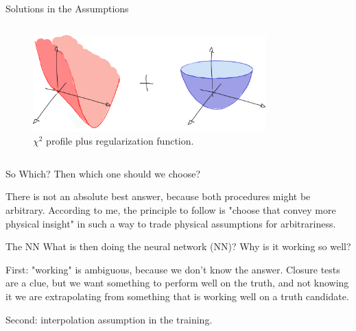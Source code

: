 \documentclass[9pt]{beamer}
\begin{document}
\begin{frame}{Solutions in the Assumptions}
\begin{columns}
\begin{column}{0.5\textwidth}
            \begin{figure}
                \centering
                \includegraphics[width=0.8\textwidth]{regularized}
                \caption{$\chi^2$ profile plus regularization function.}
            \end{figure}
        \end{column}
    \end{columns}
\end{frame}

\begin{frame}{So Which?}
    Then which one should we choose?

    There is not an absolute best answer, because both procedures might be arbitrary.
    According to me, the principle to follow is "choose that convey more
    physical insight" in such a way to trade physical assumptions for arbitrariness.
\end{frame}

\begin{frame}{The NN}
    What is then doing the neural network (NN)? Why is it working so well?

    First: "working" is ambiguous, because we don't know the answer. Closure
    tests are a clue, but we want something to perform well on the truth, and
    not knowing it we are extrapolating from something that is working well on
    a truth candidate.

    Second: interpolation assumption in the training.
\end{frame}
\end{document}
